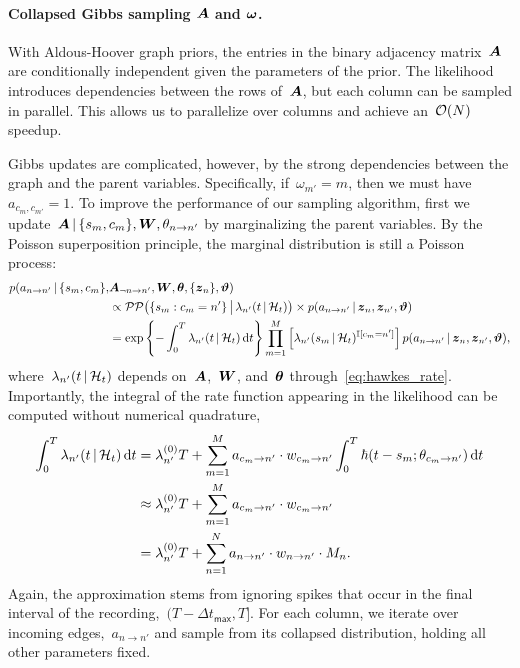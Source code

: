 \paragraph{Collapsed Gibbs sampling $\boldsymbol{A}$ and $\boldsymbol{\omega}$.}
With Aldous-Hoover graph priors, the entries in the binary adjacency
matrix~$\boldsymbol{A}$ are conditionally independent given the parameters of the
prior. The likelihood introduces dependencies between the rows
of~$\boldsymbol{A}$, but each column can be sampled in parallel.
This
allows us to parallelize over columns and achieve an~$\mathcal{O}(N)$
speedup.

Gibbs updates
are complicated, however, by the strong dependencies between the graph and the
parent variables. Specifically, if~${\omega_{m'}=m}$, then
we must have~${a_{c_{m},c_{m'}}=1}$. To improve the performance of our
sampling algorithm, first we
update~${\boldsymbol{A}\,|\,\{s_m,c_m\},\boldsymbol{W},\theta_{n \to n'}}$ by marginalizing
the parent variables. By the Poisson superposition principle, the marginal
distribution is still a Poisson process:
\begin{align*}
  p(a_{n \to n'} \,|\, \{s_m, c_m\}, &\boldsymbol{A}_{\neg n \to n'}, \boldsymbol{W}, \boldsymbol{\theta}, \{\boldsymbol{z}_n\}, \boldsymbol{\vartheta}) 
  \\
  &\propto \mathcal{PP} \big(\{s_m: c_m=n'\} \, \big| \, \lambda_{n'}(t \,|\, \mathcal{H}_t)\big)
  \times p(a_{n \to n'} \,|\, \boldsymbol{z}_n, \boldsymbol{z}_{n'}, \boldsymbol{\vartheta}) \\
  &= \exp \left \{ -\int_0^T \lambda_{n'}(t \,|\, \mathcal{H}_t) \, \mathrm{d}t \right\}
  \prod_{m=1}^M \left[ \lambda_{n'}(s_m \,|\, \mathcal{H}_t)^{\mathbb{I}[c_m=n']} \right]
  p(a_{n \to n'}  \,|\, \boldsymbol{z}_n, \boldsymbol{z}_{n'}, \boldsymbol{\vartheta}),
\end{align*}
where~$\lambda_{n'}(t \,|\, \mathcal{H}_t)$ depends on~$\boldsymbol{A}$,~$\boldsymbol{W}$, and~$\boldsymbol{\theta}$
through~\eqref{eq:hawkes_rate}.
Importantly, the integral of the rate function appearing in the
likelihood can be computed without numerical quadrature,
\begin{align*}
  \int_0^T \lambda_{n'}(t \,|\, \mathcal{H}_t) \, \mathrm{d}t
  &= \lambda^{(0)}_{n'} T +
  \sum_{m=1}^M a_{c_m \to n'} \cdot w_{c_m \to n'}
  \int_0^T  \hbar(t-s_m; \theta_{c_m \to n'}) \, \mathrm{d}t \\
  &\approx \lambda^{(0)}_{n'} T + \sum_{m=1}^M a_{c_m \to n'} \cdot w_{c_m \to n'} \\
  &= \lambda^{(0)}_{n'} T + \sum_{n=1}^N a_{n \to n'} \cdot w_{n \to n'} \cdot M_{n}.
\end{align*}
Again, the approximation stems from ignoring spikes that occur in the
final interval of the recording,~${(T-\Delta t_{\mathsf{max}}, T]}$.
  For each column, we iterate over incoming edges,~$a_{n \to n'}$ and
  sample from its collapsed distribution, holding all other parameters
  fixed.

